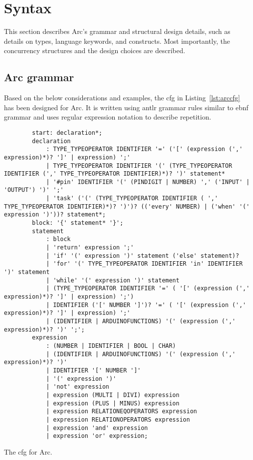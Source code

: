 \section{Syntax}\label{sec:syntax}
This section describes Arc's grammar and structural design details, such as details on types, language keywords, and constructs. Most importantly, the concurrency structures and the design choices are described.

\subsection{Arc grammar}\label{sec:arcgrammar}
Based on the below considerations and examples, the \gls{cfg} in Listing~\ref{lst:arccfg} has been designed for Arc. It is written using \gls{antlr} grammar rules similar to \gls{ebnf} grammar and uses regular expression notation to describe repetition.


\begin{listing}[htb!]
    \begin{verbatim}
        start: declaration*;
        declaration
            : TYPE_TYPEOPERATOR IDENTIFIER '=' ('[' (expression (',' expression)*)? ']' | expression) ';'
            | TYPE_TYPEOPERATOR IDENTIFIER '(' (TYPE_TYPEOPERATOR IDENTIFIER (',' TYPE_TYPEOPERATOR IDENTIFIER)*)? ')' statement*
            | '#pin' IDENTIFIER '(' (PINDIGIT | NUMBER) ',' ('INPUT' | 'OUTPUT') ')' ';'
            | 'task' ('(' (TYPE_TYPEOPERATOR IDENTIFIER ( ',' TYPE_TYPEOPERATOR IDENTIFIER)*)? ')')? (('every' NUMBER) | ('when' '(' expression ')'))? statement*;
        block: '{' statement* '}';
        statement
            : block
            | 'return' expression ';'
            | 'if' '(' expression ')' statement ('else' statement)?
            | 'for' '(' TYPE_TYPEOPERATOR IDENTIFIER 'in' IDENTIFIER ')' statement
            | 'while' '(' expression ')' statement
            | (TYPE_TYPEOPERATOR IDENTIFIER '=' ( '[' (expression (',' expression)*)? ']' | expression) ';')
            | IDENTIFIER ('[' NUMBER ']')? '=' ( '[' (expression (',' expression)*)? ']' | expression) ';'
            | (IDENTIFIER | ARDUINOFUNCTIONS) '(' (expression (',' expression)*)? ')' ';';
        expression
            : (NUMBER | IDENTIFIER | BOOL | CHAR)
            | (IDENTIFIER | ARDUINOFUNCTIONS) '(' (expression (',' expression)*)? ')'
            | IDENTIFIER '[' NUMBER ']'
            | '(' expression ')'
            | 'not' expression
            | expression (MULTI | DIVI) expression
            | expression (PLUS | MINUS) expression
            | expression RELATIONEQOPERATORS expression
            | expression RELATIONOPERATORS expression
            | expression 'and' expression
            | expression 'or' expression;
    \end{verbatim}
    \caption{The \gls{cfg} for Arc.}
    \label{lst:arccfg}
\end{listing}


